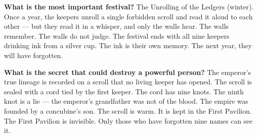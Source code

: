 \begin{almanac}
\textbf{What is the most important festival?} The Unrolling of the Ledgers (winter). Once a year, the keepers unroll a single forbidden scroll and read it aloud to each other --- but they read it in a whisper, and only the walls hear. The walls remember. The walls do not judge. The festival ends with all nine keepers drinking ink from a silver cup. The ink is their own memory. The next year, they will have forgotten.

\textbf{What is the secret that could destroy a powerful person?} The emperor's true lineage is recorded on a scroll that no living keeper has opened. The scroll is sealed with a cord tied by the first keeper. The cord has nine knots. The ninth knot is a lie --- the emperor's grandfather was not of the blood. The empire was founded by a concubine's son. The scroll is warm. It is kept in the First Pavilion. The First Pavilion is invisible. Only those who have forgotten nine names can see it.
\end{almanac}

\newpage

\newpage